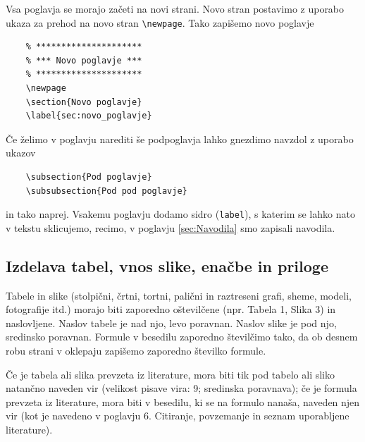 \documentclass[12pt]{article}
\theoremstyle{definition}
\begin{document}
Vsa poglavja se morajo začeti na novi strani. Novo stran postavimo z uporabo ukaza za prehod na novo stran \texttt{\textbackslash newpage}. Tako zapišemo novo poglavje

\begin{verbatim}
	% *********************
	% *** Novo poglavje ***
	% *********************
	\newpage
	\section{Novo poglavje}
	\label{sec:novo_poglavje}	
\end{verbatim}

Če želimo v poglavju narediti še podpoglavja lahko gnezdimo navzdol z uporabo ukazov

\begin{verbatim}
	\subsection{Pod poglavje}
	\subsubsection{Pod pod poglavje}
\end{verbatim}

in tako naprej. Vsakemu poglavju dodamo sidro (\texttt{label}), s katerim se lahko nato v tekstu sklicujemo, recimo, v poglavju \ref{sec:Navodila} smo zapisali navodila.

\subsection{Izdelava tabel, vnos slike, enačbe in priloge}

Tabele in slike (stolpični, črtni, tortni, palični in raztreseni grafi, sheme, modeli, fotografije itd.) morajo biti zaporedno oštevilčene (npr. Tabela 1, Slika 3) in naslovljene. Naslov tabele je nad njo, levo poravnan. Naslov slike je pod njo, sredinsko poravnan. Formule v besedilu zaporedno številčimo tako, da ob desnem robu strani v oklepaju zapišemo zaporedno številko formule.

Če je tabela ali slika prevzeta iz literature, mora biti tik pod tabelo ali sliko natančno naveden vir (velikost pisave vira: 9; sredinska poravnava); če je formula prevzeta iz literature, mora biti v besedilu, ki se na formulo nanaša, naveden njen vir (kot je navedeno v poglavju 6. Citiranje, povzemanje in seznam uporabljene literature). 
\end{document}
